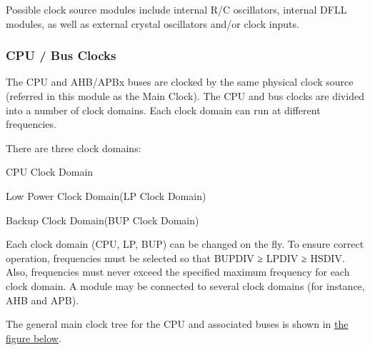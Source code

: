Possible clock source modules include internal R/\+C oscillators, internal D\+F\+L\+L modules, as well as external crystal oscillators and/or clock inputs.\hypertarget{group__asfdoc__sam0__system__clock__group_asfdoc_sam0_system_clock_module_overview_cpu_clock}{}\subsubsection{C\+P\+U / Bus Clocks}\label{group__asfdoc__sam0__system__clock__group_asfdoc_sam0_system_clock_module_overview_cpu_clock}
The C\+P\+U and A\+H\+B/\+A\+P\+Bx buses are clocked by the same physical clock source (referred in this module as the Main Clock). The C\+P\+U and bus clocks are divided into a number of clock domains. Each clock domain can run at different frequencies.

There are three clock domains\+:


\begin{DoxyItemize}
\item C\+P\+U Clock Domain
\item Low Power Clock Domain(\+L\+P Clock Domain)
\item Backup Clock Domain(\+B\+U\+P Clock Domain)
\end{DoxyItemize}

Each clock domain (C\+P\+U, L\+P, B\+U\+P) can be changed on the fly. To ensure correct operation, frequencies must be selected so that B\+U\+P\+D\+I\+V ≥ L\+P\+D\+I\+V ≥ H\+S\+D\+I\+V. Also, frequencies must never exceed the specified maximum frequency for each clock domain. A module may be connected to several clock domains (for instance, A\+H\+B and A\+P\+B).

The general main clock tree for the C\+P\+U and associated buses is shown in \hyperlink{group__asfdoc__sam0__system__clock__group_asfdoc_sam0_system_clock_module_clock_tree}{the figure below}.

